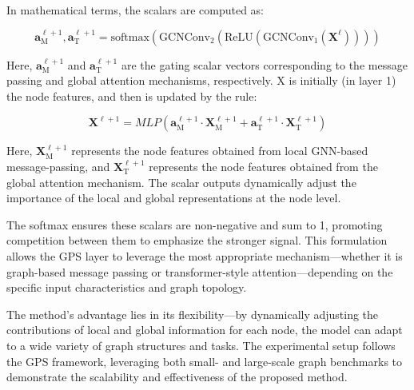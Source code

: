 \documentclass{acmart}
\begin{document}
In mathematical terms, the scalars are computed as:

\begin{equation}
\mathbf{a}_{\text{M}}^{\ell+1}, \mathbf{a}_{\text{T}}^{\ell+1} = \text{softmax}\left(\text{GCNConv}_2\left(\text{ReLU}\left(\text{GCNConv}_1(\mathbf{X}^{\ell})\right)\right)\right)
\end{equation}


Here, \( \mathbf{a}_{\text{M}}^{\ell+1} \) and \( \mathbf{a}_{\text{T}}^{\ell+1} \) are the gating scalar vectors corresponding to the message passing and global attention mechanisms, respectively. X is initially (in layer 1) the node features, and then is updated by the rule:

\[
\mathbf{X}^{\ell+1} = MLP(\mathbf{a}_{\text{M}}^{\ell+1} \cdot \mathbf{X}_{\text{M}}^{\ell+1} + \mathbf{a}_{\text{T}}^{\ell+1} \cdot \mathbf{X}_{\text{T}}^{\ell+1})
\]

Here, $\mathbf{X}_{\text{M}}^{\ell+1}$ represents the node features obtained from local GNN-based message-passing, and $\mathbf{X}_{\text{T}}^{\ell+1}$ represents the node features obtained from the global attention mechanism. The scalar outputs dynamically adjust the importance of the local and global representations at the node level.

The softmax ensures these scalars are non-negative and sum to 1, promoting competition between them to emphasize the stronger signal. This formulation allows the GPS layer to leverage the most appropriate mechanism—whether it is graph-based message passing or transformer-style attention—depending on the specific input characteristics and graph topology.


The method's advantage lies in its flexibility—by dynamically adjusting the contributions of local and global information for each node, the model can adapt to a wide variety of graph structures and tasks. The experimental setup follows the GPS framework, leveraging both small- and large-scale graph benchmarks to demonstrate the scalability and effectiveness of the proposed method.
\end{document}
